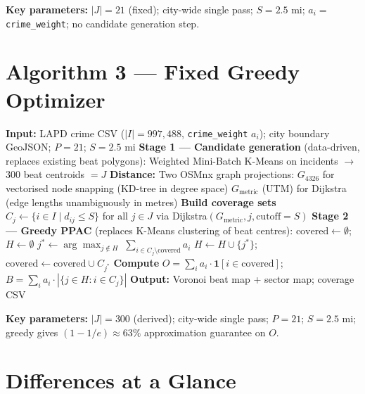 \documentclass[11pt]{article}
\begin{document}
\noindent\textbf{Key parameters:} $|J|=21$ (fixed); city-wide single pass;
$S=2.5$ mi; $a_i =$ \texttt{crime\_weight}; no candidate generation step.

\section*{Algorithm 3 — Fixed Greedy Optimizer}

\begin{algorithm}[H]
\caption{Fixed PPAC Optimizer (Greedy + Road-Network)}
\begin{algorithmic}[1]
\State \textbf{Input:} LAPD crime CSV ($|I|=997{,}488$, \texttt{crime\_weight} $a_i$);
       city boundary GeoJSON; $P=21$; $S=2.5$ mi
\State \textbf{Stage 1 — Candidate generation} {\color{diff}(data-driven, replaces existing beat polygons):}
\Statex \quad Weighted Mini-Batch K-Means on incidents $\to$ 300 beat centroids $= J$
\State \textbf{Distance:} {\color{diff}Two OSMnx graph projections:}
\Statex \quad $G_\text{4326}$ for vectorised node snapping (KD-tree in degree space)
\Statex \quad $G_\text{metric}$ (UTM) for Dijkstra (edge lengths unambiguously in metres)
\State \textbf{Build coverage sets} $C_j \leftarrow \{i \in I \mid d_{ij} \le S\}$ for all $j \in J$
       via Dijkstra$(G_\text{metric}, j, \text{cutoff}=S)$
\State \textbf{Stage 2 — Greedy PPAC} {\color{diff}(replaces K-Means clustering of beat centres):}
\Statex \quad $\text{covered} \leftarrow \emptyset$; \; $H \leftarrow \emptyset$
  \State $j^* \leftarrow \arg\max_{j \notin H}\; \sum_{i \in C_j \setminus \text{covered}} a_i$
  \State $H \leftarrow H \cup \{j^*\}$; \quad $\text{covered} \leftarrow \text{covered} \cup C_{j^*}$
\EndFor
\State \textbf{Compute} $O = \sum_i a_i \cdot \mathbf{1}[i \in \text{covered}]$;
       $B = \sum_i a_i \cdot |\{j \in H : i \in C_j\}|$
\State \textbf{Output:} Voronoi beat map + sector map; coverage CSV
\end{algorithmic}
\end{algorithm}

\noindent\textbf{Key parameters:} $|J|=300$ (derived); city-wide single pass;
$P=21$; $S=2.5$ mi; greedy gives $(1-1/e)\approx 63\%$ approximation guarantee on $O$.

\section*{Differences at a Glance}
\end{document}
